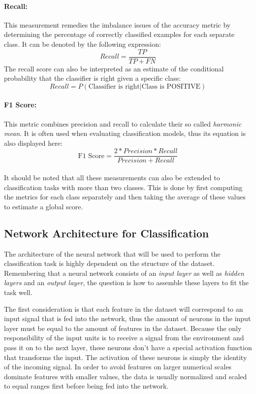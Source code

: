 \paragraph{Recall:} This measurement remedies the imbalance issues of
the accuracy metric by determining the percentage of correctly
classified examples for each separate class. It can be denoted by the
following expression:
\begin{equation}
  Recall = \frac{TP}{TP + FN}
\end{equation}
The recall score can also be interpreted as an estimate of the conditional
probability that the
classifier is right given a specific class:
\begin{equation*}
  Recall = P(\text{Classifier is right} \vert \text{Class is POSITIVE})
\end{equation*}

\paragraph{F1 Score:} This metric combines precision and recall to
calculate their so called \textit{harmonic mean}. It is often used
when evaluating classification models, thus its equation is also
displayed here:
\begin{equation}
  \text{F1 Score} = \frac{2*Precision*Recall}{Precision+Recall}
\end{equation}
\\
It should be noted that all these measurements can also be extended to
classification tasks with more than two classes. This is done
by first computing the metrics for each class separately and then
taking the average of these values to estimate a global score.

\subsection{Network Architecture for Classification}
\label{sec:classification-architecture}

The architecture of the neural network that will be used to perform
the classification task is highly dependent on the structure of the
dataset. Remembering that a neural network consists of an
\textit{input layer} as well as \textit{hidden layers} and an
\textit{output layer}, the question is how to assemble these layers to
fit the task well.

The first consideration is that each feature in the dataset will
correspond to an input signal that is fed into the network, thus the
amount of neurons in the input layer must be equal to the amount of
features in the dataset. Because the only responsibility of the input
units is to receive a signal from the environment and pass it on to
the next layer, these neurons don't have a special activation function
that transforms the input. The activation of these neurons is simply
the identity of the incoming signal. In order to avoid features on larger
numerical scales dominate features with smaller values, the data is
usually normalized and scaled to equal ranges first before being fed
into the network.

